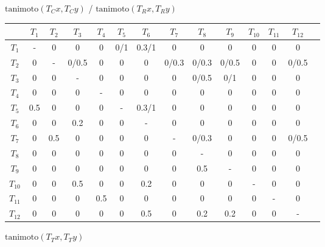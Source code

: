     \centerline{$\mbox{tanimoto}(T_Cx, T_Cy)$ / $\mbox{tanimoto}(T_Rx, T_Ry)$ }
\begin{singlespace}
    \begin{table}[h!]
      \centering
      \small
      \begin{tabular}{c|ccccccccccccc}
        & $T_1$ & $T_2$ & $T_3$ & $T_4$ & $T_5$ & $T_6$ & $T_7$ & $T_8$ & $T_9$ & $T_{10}$ & $T_{11}$ & $T_{12}$ \\
        \hline
        $T_1$       & -     & 0     & 0         & 0     & 0/1   & 0.3/1     & 0         & 0         & 0         & 0     & 0     & 0         \\
        $T_2$       & 0     & -     & 0/0.5     & 0     & 0     & 0         & 0/0.3     & 0/0.3     & 0/0.5     & 0     & 0     & 0/0.5     \\
        $T_3$       & 0     & 0     & -         & 0     & 0     & 0         & 0         & 0/0.5     & 0/1       & 0     & 0     & 0         \\
        $T_4$       & 0     & 0     & 0         & -     & 0     & 0         & 0         & 0         & 0         & 0     & 0     & 0         \\
        $T_5$       & 0.5   & 0     & 0         & 0     & -     & 0.3/1     & 0         & 0         & 0         & 0     & 0     & 0         \\
        $T_6$       & 0     & 0     & 0.2       & 0     & 0     & -         & 0         & 0         & 0         & 0     & 0     & 0         \\
        $T_7$       & 0     & 0.5   & 0         & 0     & 0     & 0         & -         & 0/0.3     & 0         & 0     & 0     & 0/0.5     \\
        $T_8$       & 0     & 0     & 0         & 0     & 0     & 0         & 0         & -         & 0         & 0     & 0     & 0         \\
        $T_9$       & 0     & 0     & 0         & 0     & 0     & 0         & 0         & 0.5       & -         & 0     & 0     & 0         \\
        $T_{10}$    & 0     & 0     & 0.5       & 0     & 0     & 0.2       & 0         & 0         & 0         & -     & 0     & 0         \\
        $T_{11}$    & 0     & 0     & 0         & 0.5   & 0     & 0         & 0         & 0         & 0         & 0     & -     & 0         \\
        $T_{12}$    & 0     & 0     & 0         & 0     & 0     & 0.5       & 0         & 0.2       & 0.2       & 0     & 0     & -         \\
      \end{tabular}
    \end{table}
\end{singlespace}
    \centerline{$\mbox{tanimoto}(T_Tx, T_Ty)$}
\bigskip

